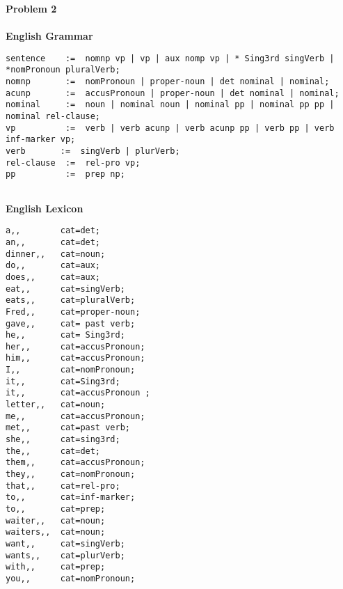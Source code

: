 \documentclass[ruled]{article}
\begin{document}
\textbf{Problem 2}\\ \\

\textbf{English Grammar}
\begin{verbatim}
sentence    :=  nomnp vp | vp | aux nomp vp | * Sing3rd singVerb | *nomPronoun pluralVerb;
nomnp	    :=  nomPronoun | proper-noun | det nominal | nominal;
acunp	    :=  accusPronoun | proper-noun | det nominal | nominal;
nominal     :=  noun | nominal noun | nominal pp | nominal pp pp | nominal rel-clause;
vp          :=  verb | verb acunp | verb acunp pp | verb pp | verb inf-marker vp;
verb       :=  singVerb | plurVerb;
rel-clause  :=  rel-pro vp;
pp          :=  prep np;


\end{verbatim}

\textbf{English Lexicon}
\begin{verbatim}
a,,        cat=det;
an,,       cat=det;
dinner,,   cat=noun;
do,,       cat=aux;
does,,     cat=aux;
eat,,      cat=singVerb;
eats,,     cat=pluralVerb;
Fred,,     cat=proper-noun;
gave,,     cat= past verb;
he,,       cat= Sing3rd;
her,,      cat=accusPronoun;
him,,      cat=accusPronoun;
I,,        cat=nomPronoun;
it,,       cat=Sing3rd;
it,,       cat=accusPronoun ;
letter,,   cat=noun;
me,,       cat=accusPronoun;
met,,      cat=past verb;
she,,      cat=sing3rd;
the,,      cat=det;
them,,     cat=accusPronoun;
they,,     cat=nomPronoun;
that,,     cat=rel-pro;
to,,       cat=inf-marker;
to,,       cat=prep;
waiter,,   cat=noun;
waiters,,  cat=noun;
want,,     cat=singVerb;
wants,,    cat=plurVerb;
with,,     cat=prep;
you,,      cat=nomPronoun;
\end{verbatim}
\end{document}
